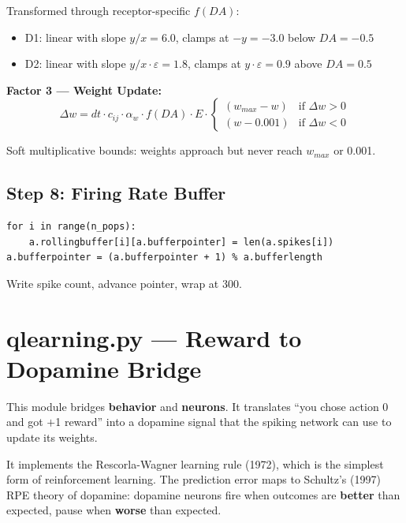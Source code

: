 \documentclass[11pt,a4paper]{article}
\begin{document}
Transformed through receptor-specific $f(DA)$:
\begin{itemize}
    \item D1: linear with slope $y/x = 6.0$, clamps at $-y = -3.0$ below $DA = -0.5$
    \item D2: linear with slope $y/x \cdot \varepsilon = 1.8$, clamps at $y \cdot \varepsilon = 0.9$ above $DA = 0.5$
\end{itemize}

\textbf{Factor 3 --- Weight Update:}
\begin{equation}
\Delta w = dt \cdot c_{ij} \cdot \alpha_w \cdot f(DA) \cdot E \cdot \begin{cases} (w_{max} - w) & \text{if } \Delta w > 0 \\ (w - 0.001) & \text{if } \Delta w < 0 \end{cases}
\end{equation}

Soft multiplicative bounds: weights approach but never reach $w_{max}$ or 0.001.

\subsection{Step 8: Firing Rate Buffer}

\begin{lstlisting}
for i in range(n_pops):
    a.rollingbuffer[i][a.bufferpointer] = len(a.spikes[i])
a.bufferpointer = (a.bufferpointer + 1) % a.bufferlength
\end{lstlisting}

Write spike count, advance pointer, wrap at 300.

\newpage
\section{qlearning.py --- Reward to Dopamine Bridge}

This module bridges \textbf{behavior} and \textbf{neurons}. It translates ``you chose action 0 and got $+$1 reward'' into a dopamine signal that the spiking network can use to update its weights.

It implements the Rescorla-Wagner learning rule (1972), which is the simplest form of reinforcement learning. The prediction error maps to Schultz's (1997) RPE theory of dopamine: dopamine neurons fire when outcomes are \textbf{better} than expected, pause when \textbf{worse} than expected.
\end{document}
